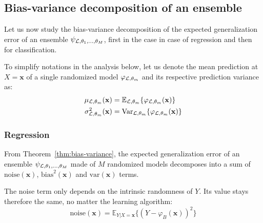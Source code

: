 \subsection{Bias-variance decomposition of an ensemble}
\label{sec:4:bias-variance:ensemble}

Let us now study the bias-variance decomposition of the expected generalization
error of an ensemble $\psi_{{\cal L},\theta_1,\dots,\theta_M}$, first in the
case in case of regression and then for classification.

To simplify notations in the analysis below, let us denote the mean prediction at
$X=\mathbf{x}$ of a single randomized model $\varphi_{{\cal L},\theta_m}$ and its
respective prediction variance as:
\begin{align}
\mu_{{\cal L},\theta_m}(\mathbf{x}) &= \mathbb{E}_{{\cal L},\theta_m} \{ \varphi_{{\cal L},\theta_m}(\mathbf{x}) \} \\
\sigma^2_{{\cal L},\theta_m}(\mathbf{x}) &= \text{Var}_{{\cal L},\theta_m} \{ \varphi_{{\cal L},\theta_m}(\mathbf{x}) \}
\end{align}

\subsubsection{Regression}

From Theorem~\ref{thm:bias-variance}, the expected generalization error of an
ensemble $\psi_{{\cal L},\theta_1,\dots,\theta_M}$ made of $M$ randomized
models decomposes into a sum of $\text{noise}(\mathbf{x})$,
$\text{bias}^2(\mathbf{x})$ and $\text{var}(\mathbf{x})$ terms.

The noise term only depends on the intrinsic randomness of $Y$. Its value
stays therefore the same, no matter the learning algorithm:
\begin{equation}
\text{noise}(\mathbf{x}) = \mathbb{E}_{Y|X=\mathbf{x}} \{ (Y - \varphi_B(\mathbf{x}))^2 \}
\end{equation}

